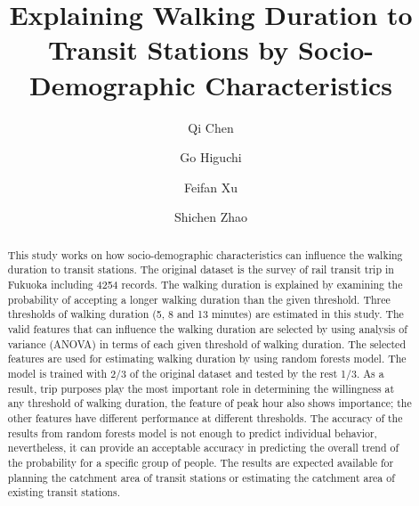\documentclass[Journal,letterpaper]{ascelike-new}
\begin{document}
\title{Explaining Walking Duration to Transit Stations by Socio-Demographic Characteristics}
%
\author[1]{Qi Chen}
\author[2]{Go Higuchi}
\author[1]{Feifan Xu}
\author[3]{Shichen Zhao}
%
%
\maketitle
\begin{abstract}
This study works on how socio-demographic characteristics can influence the walking duration to transit stations. The original dataset is the survey of rail transit trip in Fukuoka including 4254 records. The walking duration is explained by examining the probability of accepting a longer walking duration than the given threshold. Three thresholds of walking duration (5, 8 and 13 minutes) are estimated in this study. The valid features that can influence the walking duration are selected by using analysis of variance (ANOVA) in terms of each given threshold of walking duration. The selected features are used for estimating walking duration by using random forests model. The model is trained with 2/3 of the original dataset and tested by the rest 1/3. As a result, trip purposes play the most important role in determining the willingness at any threshold of walking duration, the feature of peak hour also shows importance; the other features have different performance at different thresholds. The accuracy of the results from random forests model is not enough to predict individual behavior, nevertheless, it can provide an acceptable accuracy in predicting the overall trend of the probability for a specific group of people. The results are expected available for planning the catchment area of transit stations or estimating the catchment area of existing transit stations.
\end{abstract}
%
\end{document}
